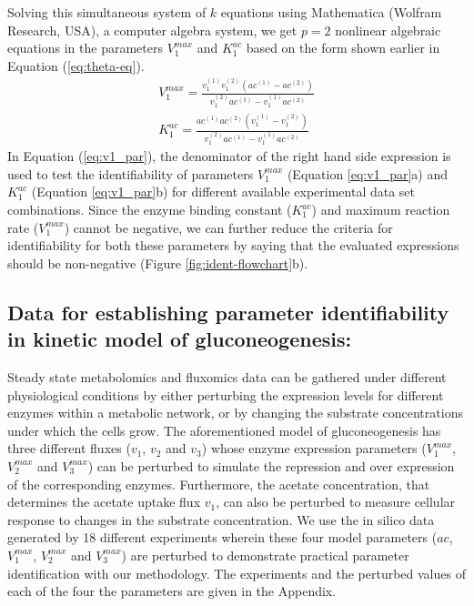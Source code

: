 \documentclass[10pt]{article}
\begin{document}
Solving this simultaneous system of $k$ equations using Mathematica (Wolfram Research, USA), a computer algebra system, we get $p=2$ nonlinear algebraic equations in the parameters $V_1^{max}$ and $K_1^{ac}$ based on the form shown earlier in Equation (\ref{eq:theta-eq}).
\begin{subequations}\label{eq:v1_par}
	\begin{align}		
	V_1^{max} = \frac{v_1^{(1)}v_1^{(2)}(ac^{(1)}-ac^{(2)})}{v_1^{(2)}ac^{(1)}-v_1^{(1)}ac^{(2)}}\\
	K_1^{ac} = \frac{ac^{(1)}ac^{(2)}(v_1^{(1)}-v_1^{(2)})}{v_1^{(2)}ac^{(1)}-v_1^{(1)}ac^{(2)}}
	\end{align}
\end{subequations}
In Equation (\ref{eq:v1_par}), the denominator of the right hand side expression is used to test the identifiability of parameters $V_1^{max}$ (Equation \ref{eq:v1_par}a) and $K_1^{ac}$ (Equation \ref{eq:v1_par}b) for different available experimental data set combinations. Since the enzyme binding constant ($K_1^{ac}$) and maximum reaction rate ($V_1^{max}$) cannot be negative, we can further reduce the criteria for identifiability for both these parameters by saying that the evaluated expressions should be non-negative (Figure \ref{fig:ident-flowchart}b). 

\subsection{Data for establishing parameter identifiability in kinetic model of gluconeogenesis:}\label{sec:experiments}
Steady state metabolomics and fluxomics data can be gathered under different physiological conditions by either perturbing the expression levels for different enzymes within a metabolic network, or by changing the substrate concentrations under which the cells grow. The aforementioned model of gluconeogenesis has three different fluxes ($v_1$, $v_2$ and $v_3$) whose enzyme expression parameters ($V_1^{max}$, $V_2^{max}$ and $V_3^{max}$) can be perturbed to simulate the repression and over expression of the corresponding enzymes. Furthermore, the acetate concentration, that determines the acetate uptake flux $v_1$, can also be perturbed to measure cellular response to changes in the substrate concentration. We use the in silico data generated by 18 different experiments wherein these four model parameters ($ac$, $V_1^{max}$, $V_2^{max}$ and $V_3^{max}$) are perturbed to demonstrate practical parameter identification with our methodology. The experiments and the perturbed values of each of the four the parameters are given in the Appendix.
\end{document}
